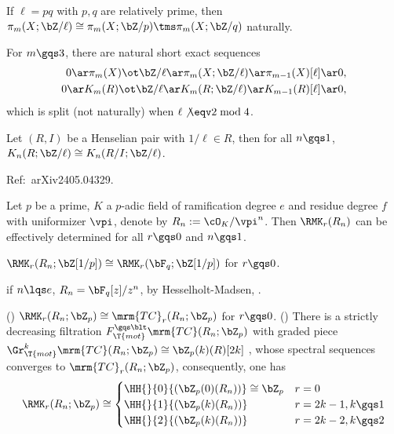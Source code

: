 \documentclass[article, a4paper, twoside]{universal}
\begin{document}
\begin{thm}
    If $\ell=pq$ with $p,q$ are relatively prime, then $\pi_{m}(X;\bZ/\ell)\cong\pi_{m}(X;\bZ/p)\tms\pi_{m}(X;\bZ/q)$ naturally.
\end{thm}

\begin{thm}
    For $m\gqs3$, there are natural short exact sequences
    \begin{align*}
        0\ar\pi_{m}(X)\ot\bZ/\ell\ar\pi_{m}(X;\bZ/\ell)\ar\pi_{m-1}(X)[\ell]\ar0,\\
        0\ar K_{m}(R)\ot\bZ/\ell\ar K_{m}(R;\bZ/\ell)\ar K_{m-1}(R)[\ell]\ar 0,
    \end{align*}
    which is split (not naturally) when $\ell\not\eqv 2\bmod{4}$.
\end{thm}

\begin{thm}
    Let $(R,I)$ be a Henselian pair with $1/\ell\in R$, then for all $n\gqs1$, $K_{n}(R;\bZ/\ell)\cong K_{n}(R/I;\bZ/\ell)$.
\end{thm}





Ref:~arXiv2405.04329.

\begin{stp}
    Let $p$ be a prime, $K$ a $p$-adic field of ramification degree $e$ and residue degree $f$ with uniformizer $\vpi$, denote by $R_{n}:=\cO_{K}/\vpi^{n}$. Then $\RMK_{r}(R_{n})$ can be effectively determined for all $r\gqs0$ and $n\gqs1$.

\end{stp}

 $\RMK_{r}(R_{n};\bZ[1/p])\cong \RMK_{r}(\bF_{q};\bZ[1/p])$ for $r\gqs0$.
\begin{cmt}[1]
if $n\lqs e$, $R_{n}=\bF_{q}[z]/z^{n}$, by Hesselholt-Madsen\cite{HM1997Cyclic}, .
\end{cmt}

(\cite{DGMC2013}) $\RMK_{r}(R_{n};\bZ_{p})\cong\mrm{TC}_{r}(R_{n};\bZ_{p})$ for $r\gqs0$. (\cite{BMS2019}) There is a strictly decreasing filtration $F_{\T{mot}}^{\gqs\blt}\mrm{TC}(R_{n};\bZ_{p})$ with graded piece $\Gr_{\T{mot}}^{k}\mrm{TC}(R_{n};\bZ_{p})\cong\bZ_{p}(k)(R)[2k]$ , whose spectral sequences converges to $\mrm{TC}_{r}(R_{n};\bZ_{p})$, consequently, one has
\[
    \RMK_{r}(R_{n};\bZ_{p})\cong \begin{cases}
      \HH{}{0}{(\bZ_{p}(0)(R_{n}))}\cong \bZ_{p} & r = 0 \\
      \HH{}{1}{(\bZ_{p}(k)(R_{n}))} & r=2k-1, k\gqs1 \\
      \HH{}{2}{(\bZ_{p}(k)(R_{n}))} & r=2k-2, k\gqs2
    \end{cases}
\]
\end{document}
